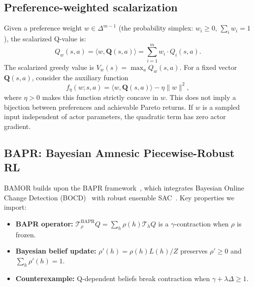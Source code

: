 \subsection{Preference-weighted scalarization}

Given a preference weight $w \in \Delta^{m-1}$ (the probability simplex: $w_i \ge 0$, $\sum_i w_i = 1$), the scalarized Q-value is:
\begin{equation}
    Q_w(s,a) = \langle w, \mathbf{Q}(s,a) \rangle = \sum_{i=1}^m w_i \cdot Q_i(s,a).
    \label{eq:scalarize}
\end{equation}
The scalarized greedy value is $V_w(s) = \max_a Q_w(s,a)$. For a fixed vector $\mathbf Q(s,a)$, consider the auxiliary function
\begin{equation}
    f_\eta(w; s,a) = \langle w, \mathbf{Q}(s,a) \rangle - \eta \|w\|^2,
    \label{eq:regularized_scalarize}
\end{equation}
where $\eta>0$ makes this function strictly concave in $w$. This does not imply a bijection between preferences and achievable Pareto returns. If $w$ is a sampled input independent of actor parameters, the quadratic term has zero actor gradient.

\subsection{BAPR: Bayesian Amnesic Piecewise-Robust RL}

BAMOR builds upon the BAPR framework~\cite{Zhang2025BAPR}, which integrates Bayesian Online Change Detection (BOCD)~\cite{Adams2007BOCD} with robust ensemble SAC~\cite{Haarnoja2018SAC, Zhang2025RESAC}.  Key properties we import:
\begin{itemize}
    \item \textbf{BAPR operator:} $\mathcal{T}^{\mathrm{BAPR}}_\rho Q = \sum_h \rho(h) \mathcal{T}_h Q$ is a $\gamma$-contraction when $\rho$ is frozen.
    \item \textbf{Bayesian belief update:} $\rho'(h) = \rho(h) L(h) / Z$ preserves $\rho' \ge 0$ and $\sum_h \rho'(h) = 1$.
    \item \textbf{Counterexample:} Q-dependent beliefs break contraction when $\gamma + \lambda\Delta \ge 1$.
\end{itemize}

